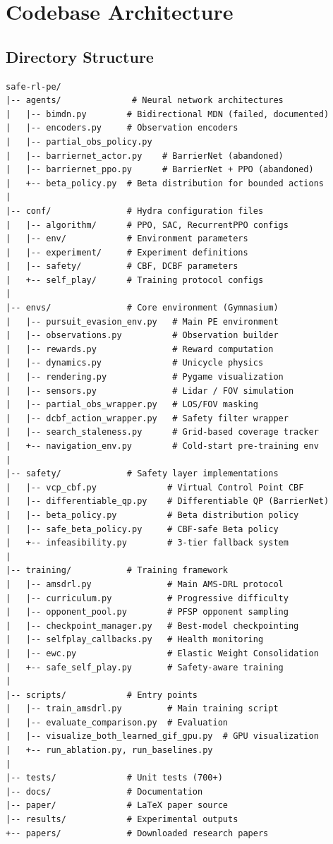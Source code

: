 \documentclass[11pt,a4paper]{report}
\begin{document}
\chapter{Codebase Architecture}
\label{chap:codebase}

\section{Directory Structure}

\begin{lstlisting}
safe-rl-pe/
|-- agents/              # Neural network architectures
|   |-- bimdn.py        # Bidirectional MDN (failed, documented)
|   |-- encoders.py     # Observation encoders
|   |-- partial_obs_policy.py
|   |-- barriernet_actor.py    # BarrierNet (abandoned)
|   |-- barriernet_ppo.py      # BarrierNet + PPO (abandoned)
|   +-- beta_policy.py  # Beta distribution for bounded actions
|
|-- conf/               # Hydra configuration files
|   |-- algorithm/      # PPO, SAC, RecurrentPPO configs
|   |-- env/            # Environment parameters
|   |-- experiment/     # Experiment definitions
|   |-- safety/         # CBF, DCBF parameters
|   +-- self_play/      # Training protocol configs
|
|-- envs/               # Core environment (Gymnasium)
|   |-- pursuit_evasion_env.py   # Main PE environment
|   |-- observations.py          # Observation builder
|   |-- rewards.py               # Reward computation
|   |-- dynamics.py              # Unicycle physics
|   |-- rendering.py             # Pygame visualization
|   |-- sensors.py               # Lidar / FOV simulation
|   |-- partial_obs_wrapper.py   # LOS/FOV masking
|   |-- dcbf_action_wrapper.py   # Safety filter wrapper
|   |-- search_staleness.py      # Grid-based coverage tracker
|   +-- navigation_env.py        # Cold-start pre-training env
|
|-- safety/             # Safety layer implementations
|   |-- vcp_cbf.py              # Virtual Control Point CBF
|   |-- differentiable_qp.py    # Differentiable QP (BarrierNet)
|   |-- beta_policy.py          # Beta distribution policy
|   |-- safe_beta_policy.py     # CBF-safe Beta policy
|   +-- infeasibility.py        # 3-tier fallback system
|
|-- training/           # Training framework
|   |-- amsdrl.py               # Main AMS-DRL protocol
|   |-- curriculum.py           # Progressive difficulty
|   |-- opponent_pool.py        # PFSP opponent sampling
|   |-- checkpoint_manager.py   # Best-model checkpointing
|   |-- selfplay_callbacks.py   # Health monitoring
|   |-- ewc.py                  # Elastic Weight Consolidation
|   +-- safe_self_play.py       # Safety-aware training
|
|-- scripts/            # Entry points
|   |-- train_amsdrl.py         # Main training script
|   |-- evaluate_comparison.py  # Evaluation
|   |-- visualize_both_learned_gif_gpu.py  # GPU visualization
|   +-- run_ablation.py, run_baselines.py
|
|-- tests/              # Unit tests (700+)
|-- docs/               # Documentation
|-- paper/              # LaTeX paper source
|-- results/            # Experimental outputs
+-- papers/             # Downloaded research papers
\end{lstlisting}
\end{document}
